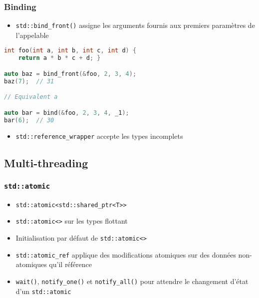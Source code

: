 \documentclass[C++.tex]{subfiles}
\begin{document}
\begin{frame}[fragile]
	\frametitle{Binding}
	\begin{itemize}
		\item \lstinline|std::bind_front()| assigne les arguments fournis aux premiers paramètres de l'appelable
	\end{itemize}

	\begin{lstlisting}[language=C++]
int foo(int a, int b, int c, int d) {
	return a * b * c + d; }

auto baz = bind_front(&foo, 2, 3, 4);
baz(7);  // 31

// Equivalent a

auto bar = bind(&foo, 2, 3, 4, _1);
bar(6);  // 30\end{lstlisting}

	\begin{itemize}
		\item \lstinline|std::reference_wrapper| accepte les types incomplets

	\end{itemize}
\end{frame}

\subsection*{Multi-threading}
\begin{frame}[fragile]
	\frametitle{\lstinline|std::atomic|}
	\begin{itemize}
		\item \lstinline|std::atomic<std::shared_ptr<T>>|
		\item \lstinline|std::atomic<>| sur les types flottant
		\item Initialisation par défaut de \lstinline|std::atomic<>|
		\item \lstinline|std::atomic_ref| applique des modifications atomiques sur des données non-atomiques qu'il référence
		\item \lstinline|wait()|, \lstinline|notify_one()| et \lstinline|notify_all()| pour attendre le changement d'état d'un \lstinline|std::atomic|
	\end{itemize}
\end{frame}
\end{document}
